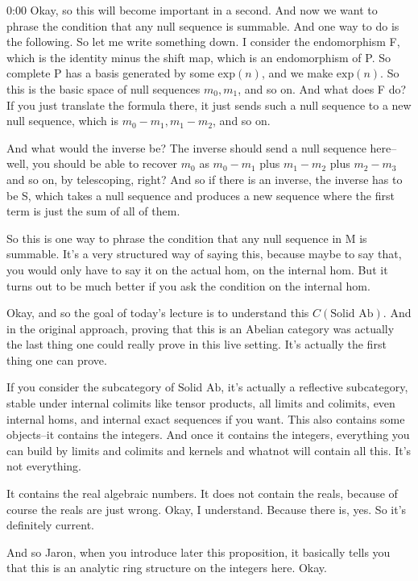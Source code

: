 \begin{unfinished}{0:00}
Okay, so this will become important in a second. And now we want to phrase the condition that any null sequence is summable. And one way to do is the following. So let me write something down. I consider the endomorphism F, which is the identity minus the shift map, which is an endomorphism of P. So complete P has a basis generated by some $\text{exp}(n)$, and we make $\text{exp}(n)$. So this is the basic space of null sequences $m_0, m_1$, and so on. And what does F do? If you just translate the formula there, it just sends such a null sequence to a new null sequence, which is $m_0 - m_1, m_1 - m_2$, and so on.

And what would the inverse be? The inverse should send a null sequence here--well, you should be able to recover $m_0$ as $m_0 - m_1$ plus $m_1 - m_2$ plus $m_2 - m_3$ and so on, by telescoping, right? And so if there is an inverse, the inverse has to be S, which takes a null sequence and produces a new sequence where the first term is just the sum of all of them.

So this is one way to phrase the condition that any null sequence in M is summable. It's a very structured way of saying this, because maybe to say that, you would only have to say it on the actual hom, on the internal hom. But it turns out to be much better if you ask the condition on the internal hom.

Okay, and so the goal of today's lecture is to understand this $C(\text{Solid } \text{Ab})$. And in the original approach, proving that this is an Abelian category was actually the last thing one could really prove in this live setting. It's actually the first thing one can prove.

If you consider the subcategory of $\text{Solid } \text{Ab}$, it's actually a reflective subcategory, stable under internal colimits like tensor products, all limits and colimits, even internal homs, and internal exact sequences if you want. This also contains some objects--it contains the integers. And once it contains the integers, everything you can build by limits and colimits and kernels and whatnot will contain all this. It's not everything.

It contains the real algebraic numbers. It does not contain the reals, because of course the reals are just wrong. Okay, I understand. Because there is, yes. So it's definitely current.

And so Jaron, when you introduce later this proposition, it basically tells you that this is an analytic ring structure on the integers here. Okay.


\end{unfinished}
